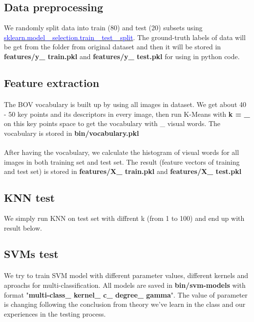 \subsection{Data preprocessing}
We randomly split data into train (80) and test (20) subsets using \href{http://scikit-learn.org/stable/modules/classes.html}{\textcolor{blue}{sklearn.model\_ selection.train\_ test\_ split}}. The ground-truth labels of data will be get from the folder from original dataset and then it will be stored in \textbf{features/y\_ train.pkl} and \textbf{features/y\_ test.pkl} for using in python code.

\subsection{Feature extraction}
\paragraph*{}
The BOV vocabulary is built up by using all images in dataset. We get about 40 - 50 key points and its descriptors in every image, then run K-Means with \textbf{k = \_} on this key points space to get the vocabulary with \_  visual words. The vocabulary is stored in \textbf{bin/vocabulary.pkl }

\paragraph*{}
After having the vocabulary, we calculate the histogram of visual words for all images in both training set and test set. The result (feature vectors of training and test set) is stored in \textbf{features/X\_ train.pkl} and \textbf{features/X\_ test.pkl}

\subsection{KNN test}
We simply run KNN on test set with diffrent k (from 1 to 100) and end up with result below.

\subsection{SVMs test}
\paragraph*{}
We try to train SVM model with different parameter values, different kernels and aproachs for multi-classification. All models are saved in \textbf{bin/svm-models} with format "\textbf{multi-class\_ kernel\_ c\_ degree\_ gamma}". The value of parameter is changing following the conclusion from theory we've learn in the class and our experiences in the testing process. 
